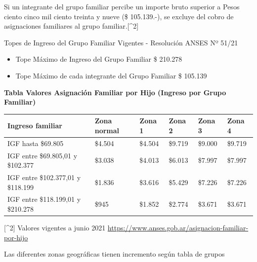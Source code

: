 \documentclass[
  12,
]{article}
\providecommand{\tightlist}{%
  \setlength{\itemsep}{0pt}\setlength{\parskip}{0pt}}
\begin{document}
Si un integrante del grupo familiar percibe un importe bruto superior a
Pesos ciento cinco mil ciento treinta y nueve (\$ 105.139.-), se excluye
del cobro de asignaciones familiares al grupo familiar.{[}\^{}2{]}

Topes de Ingreso del Grupo Familiar Vigentes - Resolución ANSES Nº 51/21

\begin{itemize}
\tightlist
\item
  Tope Máximo de Ingreso del Grupo Familiar \$ 210.278
\item
  Tope Máximo de cada integrante del Grupo Familiar \$ 105.139
\end{itemize}

\textbf{Tabla Valores Asignación Familiar por Hijo (Ingreso por Grupo
Familiar)}

\begin{longtable}[]{@{}llllll@{}}
\toprule
Ingreso familiar & Zona normal & Zona 1 & Zona 2 & Zona 3 & Zona
4\tabularnewline
\midrule
\endhead
IGF hasta \$69.805 & \$4.504 & \$4.504 & \$9.719 & \$9.000 &
\$9.719\tabularnewline
IGF entre \$69.805,01 y \$102.377 & \$3.038 & \$4.013 & \$6.013 &
\$7.997 & \$7.997\tabularnewline
IGF entre \$102.377,01 y \$118.199 & \$1.836 & \$3.616 & \$5.429 &
\$7.226 & \$7.226\tabularnewline
IGF entre \$118.199,01 y \$210.278 & \$945 & \$1.852 & \$2.774 & \$3.671
& \$3.671\tabularnewline
\bottomrule
\end{longtable}

{[}\^{}2{]} Valores vigentes a junio 2021
\url{https://www.anses.gob.ar/asignacion-familiar-por-hijo}

Las diferentes zonas geográficas tienen incremento según tabla de grupos
\end{document}
